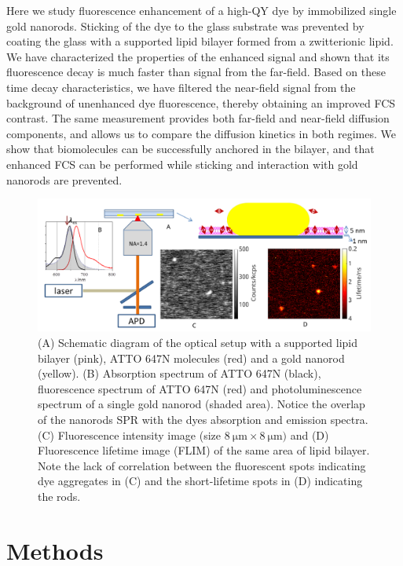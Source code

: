 Here we study fluorescence enhancement of a high-QY dye by immobilized single gold nanorods.
Sticking of the dye to the glass substrate was prevented by coating the glass with a supported lipid bilayer formed from a zwitterionic lipid.
We have characterized the properties of the enhanced signal and shown that its fluorescence decay is much faster than signal from the far-field.
Based on these time decay characteristics, we have filtered the near-field signal from the background of unenhanced dye fluorescence, thereby obtaining an improved FCS contrast.
The same measurement provides both far-field and near-field diffusion components, and allows us to compare the diffusion kinetics in both regimes. 
We show that biomolecules can be successfully anchored in the bilayer, and that enhanced FCS can be performed while sticking and interaction with gold nanorods are prevented.
\begin{figure}
	\centering
	\includegraphics[width=\textwidth]{schematic_efcs}
	\caption{(A) Schematic diagram of the optical setup with a supported lipid bilayer (pink), ATTO 647N molecules (red) and a gold nanorod (yellow).
	(B) Absorption spectrum of ATTO 647N (black), fluorescence spectrum of ATTO 647N (red) and photoluminescence spectrum of a single gold nanorod (shaded area).
	Notice the overlap of the nanorod\textquotesingle s SPR with the dye\textquotesingle s absorption and emission spectra.
	(C) Fluorescence intensity image (size $\SI{8}{\um}\times\SI{8}{\um})$ and
	(D) Fluorescence lifetime image (FLIM) of the same area of 
	lipid bilayer.
	Note the lack of correlation between the fluorescent spots indicating dye aggregates in (C) and the short-lifetime spots in (D) indicating the rods.}
	\label{fig:schematic}
\end{figure}

\section{Methods}

